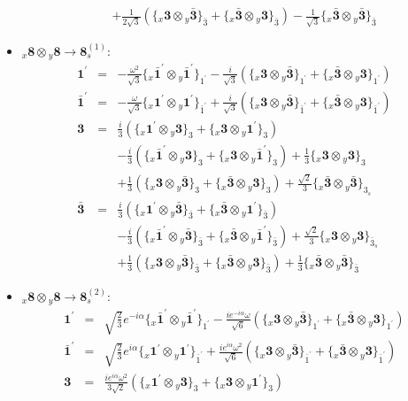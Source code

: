 \documentclass[english]{article}
\newcommand{\rep}[1]{\mathbf{#1}}
\newcommand{\repx}[2]{{}_{#2}\mathbf{#1}}
\newcommand{\subcg}[3]{\big\{ \repx{#1}{x}\otimes\repx{#2}{y}\big\}^{}_{#3}}
\begin{document}
\begin{itemize}
\begin{eqnarray*}
 & & +\frac{1}{2 \sqrt{3}}\left(\subcg{3}{\bar{3}}{\bar{3}}+\subcg{\bar{3}}{3}{\bar{3}}\right)-\frac{1}{\sqrt{3}}\subcg{\bar{3}}{\bar{3}}{\bar{3}}
\end{eqnarray*}
\item $\repx{8}{x}\otimes\repx{8}{y}\to\rep{8}_{s}^{(1)}$:
\begin{eqnarray*}
\rep{1^{\prime}} &=& -\frac{\omega ^2}{\sqrt{3}}\subcg{\bar{1}^{\prime}}{\bar{1}^{\prime}}{1^{\prime}}-\frac{i}{\sqrt{3}}\left(\subcg{3}{\bar{3}}{1^{\prime}}+\subcg{\bar{3}}{3}{1^{\prime}}\right)
\\
\rep{\bar{1}^{\prime}} &=& -\frac{\omega }{\sqrt{3}}\subcg{1^{\prime}}{1^{\prime}}{\bar{1}^{\prime}}+\frac{i}{\sqrt{3}}\left(\subcg{3}{\bar{3}}{\bar{1}^{\prime}}+\subcg{\bar{3}}{3}{\bar{1}^{\prime}}\right)
\\
\rep{3} &=& \frac{i}{3}\left(\subcg{1^{\prime}}{3}{3}+\subcg{3}{1^{\prime}}{3}\right) \\ 
 & & -\frac{i}{3}\left(\subcg{\bar{1}^{\prime}}{3}{3}+\subcg{3}{\bar{1}^{\prime}}{3}\right)+\frac{1}{3}\subcg{3}{3}{3} \\ 
 & & +\frac{1}{3}\left(\subcg{3}{\bar{3}}{3}+\subcg{\bar{3}}{3}{3}\right)+\frac{\sqrt{2}}{3}\subcg{\bar{3}}{\bar{3}}{3_{s}}
\\
\rep{\bar{3}} &=& \frac{i}{3}\left(\subcg{1^{\prime}}{\bar{3}}{\bar{3}}+\subcg{\bar{3}}{1^{\prime}}{\bar{3}}\right) \\ 
 & & -\frac{i}{3}\left(\subcg{\bar{1}^{\prime}}{\bar{3}}{\bar{3}}+\subcg{\bar{3}}{\bar{1}^{\prime}}{\bar{3}}\right)+\frac{\sqrt{2}}{3}\subcg{3}{3}{\bar{3}_{s}} \\ 
 & & +\frac{1}{3}\left(\subcg{3}{\bar{3}}{\bar{3}}+\subcg{\bar{3}}{3}{\bar{3}}\right)+\frac{1}{3}\subcg{\bar{3}}{\bar{3}}{\bar{3}}
\end{eqnarray*}
\item $\repx{8}{x}\otimes\repx{8}{y}\to\rep{8}_{s}^{(2)}$:
\begin{eqnarray*}
\rep{1^{\prime}} &=& \sqrt{\frac{2}{3}} e^{-i \alpha }\subcg{\bar{1}^{\prime}}{\bar{1}^{\prime}}{1^{\prime}}-\frac{i e^{-i \alpha } \omega }{\sqrt{6}}\left(\subcg{3}{\bar{3}}{1^{\prime}}+\subcg{\bar{3}}{3}{1^{\prime}}\right)
\\
\rep{\bar{1}^{\prime}} &=& \sqrt{\frac{2}{3}} e^{i \alpha }\subcg{1^{\prime}}{1^{\prime}}{\bar{1}^{\prime}}+\frac{i e^{i \alpha } \omega ^2}{\sqrt{6}}\left(\subcg{3}{\bar{3}}{\bar{1}^{\prime}}+\subcg{\bar{3}}{3}{\bar{1}^{\prime}}\right)
\\
\rep{3} &=& \frac{i e^{i \alpha } \omega ^2}{3 \sqrt{2}}\left(\subcg{1^{\prime}}{3}{3}+\subcg{3}{1^{\prime}}{3}\right) \\ 

\end{eqnarray*}
\end{itemize}
\end{document}
